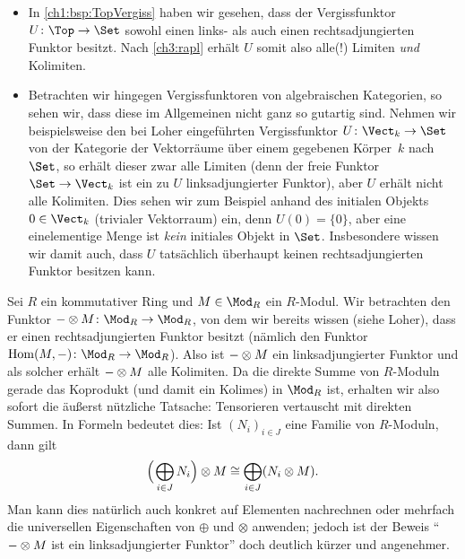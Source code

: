 \begin{thBeispiel}\hfill
    \begin{itemize}
        \item
            In \cref{ch1:bsp:TopVergiss} haben wir gesehen, dass der Vergissfunktor
            $U\colon\Top\to\Set$ sowohl einen links- als auch einen rechtsadjungierten
            Funktor besitzt. Nach \cref{ch3:rapl} erhält $U$ somit also alle(!) Limiten
            \emph{und} Kolimiten.
            
        \item
            Betrachten wir hingegen Vergissfunktoren von algebraischen Kategorien, so
            sehen wir, dass diese im Allgemeinen nicht ganz so gutartig sind. Nehmen wir
            beispielsweise den bei Loher\cite[1.3]{talk:loher} eingeführten
            Vergissfunktor $U\colon \Vect_k\to\Set$ von der Kategorie der Vektorräume
            über einem gegebenen Körper~$k$ nach $\Set$, so erhält dieser zwar alle
            Limiten (denn der freie Funktor $\Set\to\Vect_k$ ist ein zu $U$
            linksadjungierter Funktor), aber $U$ erhält nicht alle Kolimiten. Dies sehen
            wir zum Beispiel anhand des initialen Objekts $0\in\Vect_k$ (trivialer
            Vektorraum) ein, denn $U(0) = \{0\}$, aber eine einelementige Menge ist
            \emph{kein} initiales Objekt in $\Set$. Insbesondere wissen wir damit auch,
            dass $U$ tatsächlich überhaupt keinen rechtsadjungierten Funktor
            besitzen kann. 
    \end{itemize}
\end{thBeispiel}

\begin{thBeispiel}
    \newcommand{\tensorM}{\blank\otimes M}
    Sei $R$ ein kommutativer Ring und $M\in\Mod_R$ ein $R$-Modul. Wir betrachten
    den Funktor $\tensorM\colon\Mod_R\to\Mod_R$, von dem wir bereits
    wissen (siehe Loher\cite[2.8]{talk:loher}), dass er einen rechtsadjungierten
    Funktor besitzt (nämlich den Funktor $\operatorname{Hom}(M,\blank)\colon
    \Mod_R\to\Mod_R$). Also ist $\tensorM$ ein linksadjungierter Funktor und als
    solcher erhält $\tensorM$ alle Kolimiten. Da die direkte Summe von
    $R$-Moduln gerade das Koprodukt (und damit ein Kolimes) in $\Mod_R$ ist,
    erhalten wir also sofort die äußerst nützliche Tatsache:
    Tensorieren vertauscht mit direkten Summen.
    In Formeln bedeutet dies: Ist $(N_i)_{i\in J}$ eine Familie von $R$-Moduln,
    dann gilt
    \[ \Bigl(\mkern2mu \bigoplus_{i\in J} N_i \Bigr)\otimes M
        \cong \bigoplus_{i\in J} (N_i\otimes M)
    . \]
    Man kann dies natürlich auch konkret auf Elementen nachrechnen oder mehrfach
    die universellen Eigenschaften von $\oplus$ und $\otimes$ anwenden; jedoch
    ist der Beweis \enquote{$\tensorM$ ist ein linksadjungierter Funktor} doch
    deutlich kürzer und angenehmer.
\end{thBeispiel}
